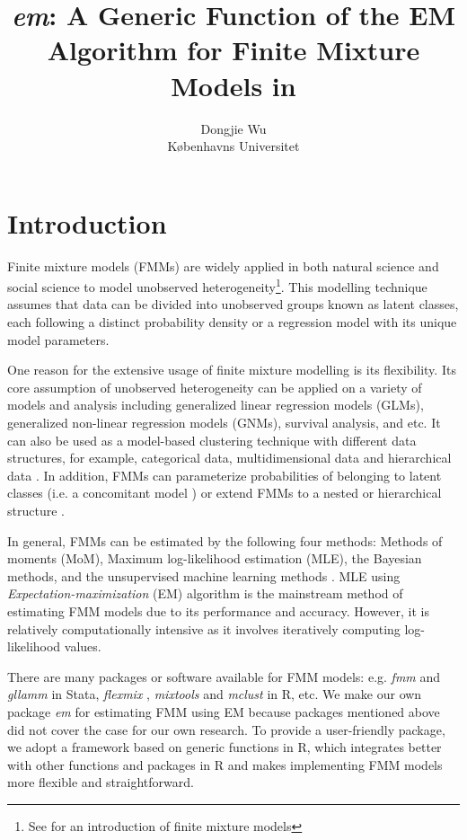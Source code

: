 \documentclass[nojss]{jss}
\title{\emph{em}: A Generic Function of the EM Algorithm for Finite Mixture Models in \proglang{R}}
\author{Dongjie Wu\\Københavns Universitet}
\begin{document}
   \section{Introduction}
Finite mixture models (FMMs) are widely applied in both natural science and social science to model unobserved heterogeneity\footnote{See \citet{mclachlan2019finite} for an introduction of finite mixture models}. This modelling technique assumes that data can be divided into unobserved groups known as latent classes, each following a distinct probability density or a regression model with its unique model parameters. 

One reason for the extensive usage of finite mixture modelling is its flexibility. Its core assumption of unobserved heterogeneity can be applied on a variety of models and analysis including generalized linear regression models (GLMs), generalized non-linear regression models (GNMs), survival analysis, and etc. It can also be used as a model-based clustering technique with different data structures, for example, categorical data, multidimensional data and hierarchical data \citep{vermunt2008latent}. In addition, FMMs can parameterize probabilities of belonging to latent classes (i.e. a concomitant model \citep{wedel2002concomitant}) or extend FMMs to a nested or hierarchical structure \citep{vermunt2005hierarchical}.

In general, FMMs can be estimated by the following four methods: Methods of moments (MoM), Maximum log-likelihood estimation (MLE), the Bayesian methods, and the unsupervised machine learning methods \citep{Figue2002}. MLE using \emph{Expectation-maximization} (EM) algorithm is the mainstream method of estimating FMM models due to its performance and accuracy. However, it is relatively computationally intensive as it involves iteratively computing log-likelihood values. 

There are many packages or software available for FMM models: e.g.  \emph{fmm} \citep{deb2007} and \emph{gllamm} \citep{rabe2004gllamm} in Stata, \emph{flexmix} \citep{leisch2004flexmix}, \emph{mixtools} \citep{benaglia2010mixtools} and \emph{mclust} \citep{scrucca2016mclust} in R, etc.
We make our own package \emph{em} for estimating FMM using EM because packages mentioned above did not cover the case for our own research. To provide a user-friendly package, we adopt a framework based on generic functions in R, which integrates better with other functions and packages in R and makes implementing FMM models more flexible and straightforward.
\end{document}
